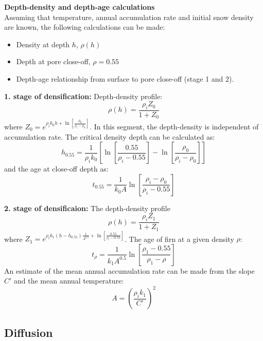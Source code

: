 \documentclass[../../CompleteThesis/Complete_1stDraft.tex]{subfiles}
\begin{document}
\textbf{Depth-density and depth-age calculations}\\
Assuming that temperature, annual accumulation rate and initial snow density are known, the following calculations can be made:
\begin{itemize}
	\item Density at depth $h$, $\rho(h)$
	\item Depth at pore close-off, $\rho=0.55$
	\item Depth-age relationship from surface to pore close-off (stage 1 and 2).
\end{itemize}
\textbf{1. stage of densification:}
Depth-density profile:
\begin{equation}
	\rho(h) = \frac{\rho_i Z_0}{1 + Z_0}
\end{equation}
where $Z_0 = e^{\rho_i k_0 h + \ln\left[\frac{\rho_0}{\rho_i - \rho_0}\right]}$. In this segment, the depth-density is independent of accumulation rate. The critical density depth can be calculated as:
\begin{equation}
	h_{0.55} = \frac{1}{\rho_i k_0}\left[\ln\left[\frac{0.55}{\rho_i - 0.55}\right] - \ln\left[\frac{\rho_0}{\rho_i - \rho_0}\right]\right]
\end{equation}
and the age at close-off depth as:
\begin{equation}
	t_{0.55} = \frac{1}{k_0 A}\ln\left[\frac{\rho_i - \rho_0}{\rho_i - 0.55}\right]
\end{equation}

\textbf{2. stage of densificaion:} The depth-density profile
\begin{equation}
	\rho(h) = \frac{\rho_i Z_1}{1 + Z_1}
\end{equation}
where $Z_1 = e^{\rho_i k_1 (h - h_{0.55})\frac{1}{A^{0.5}} + \ln\left[\frac{0.55}{\rho_i - 0.55}\right]}$. The age of firn at a given density $\rho$:
\begin{equation}
	t_{\rho} = \frac{1}{k_1 A^{0.5}}\ln\left[\frac{\rho_1 - 0.55}{\rho_1 - \rho}\right]
\end{equation}
An estimate of the mean annual accumulation rate can be made from the slope $C'$ and the mean annual temperature:
\begin{equation}
	A = \left(\frac{\rho_i k_1}{C'}\right)^2
\end{equation}

\subsection[Diffusion]{Diffusion}
\label{Subsec:Ice_DiffusionAndDensification_Diffusion}
\end{document}
